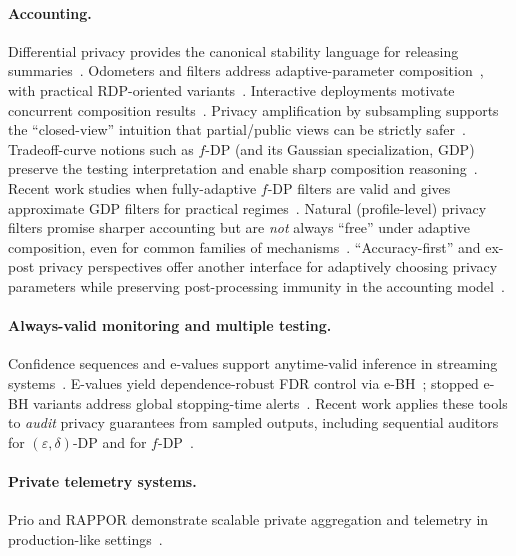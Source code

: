\documentclass[11pt]{article}
\begin{document}
\paragraph{Accounting.}
Differential privacy provides the canonical stability language for releasing summaries~\cite{dworkroth2014foundations}.
Odometers and filters address adaptive-parameter composition~\cite{rogers2016odometers}, with practical RDP-oriented variants~\cite{lecuuyer2021practical,mironov2017rdp}.
Interactive deployments motivate concurrent composition results~\cite{vadhanwang2021concurrentdp}.
Privacy amplification by subsampling supports the ``closed-view'' intuition that partial/public views can be strictly safer~\cite{balle2018subsampling}.
Tradeoff-curve notions such as $f$-DP (and its Gaussian specialization, GDP) preserve the testing interpretation and enable sharp composition reasoning~\cite{dong2022gdp}.
Recent work studies when fully-adaptive $f$-DP filters are valid and gives approximate GDP filters for practical regimes~\cite{tran2026fdpfilters}.
Natural (profile-level) privacy filters promise sharper accounting but are \emph{not} always ``free'' under adaptive composition, even for common families of mechanisms~\cite{regehr2026naturalfilters}.
``Accuracy-first'' and ex-post privacy perspectives offer another interface for adaptively choosing privacy parameters while preserving post-processing immunity in the accounting model~\cite{raisa2025accuracyfirstrdp}.


\paragraph{Always-valid monitoring and multiple testing.}
Confidence sequences and e-values support anytime-valid inference in streaming systems~\cite{howard2021confseq,ramdas2024evalues}.
E-values yield dependence-robust FDR control via e-BH~\cite{wang2022ebh}; stopped e-BH variants address global stopping-time alerts~\cite{wang2025sebH}.
Recent work applies these tools to \emph{audit} privacy guarantees from sampled outputs, including sequential auditors for $(\varepsilon,\delta)$-DP and for $f$-DP~\cite{gonzalez2025sequentiallyauditdp,kutta2026sequentialauditfdp,mahloujifar2025auditfdpone}.


\paragraph{Private telemetry systems.}
Prio and RAPPOR demonstrate scalable private aggregation and telemetry in production-like settings~\cite{corrigangibbs2017prio,erlingsson2014rappor}.
\end{document}
